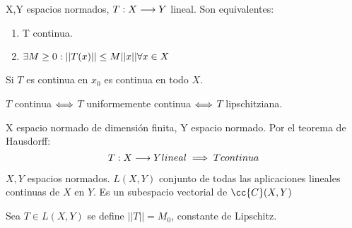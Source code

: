 \begin{prop}
    X,Y espacios normados, $T:X\longrightarrow Y$ lineal. Son equivalentes:
    \begin{enumerate}
        \item T continua.
        \item $\exists M\geq 0 : ||T(x)|| \leq M ||x|| \\\forall x\in X$
    \end{enumerate}
\end{prop}

\begin{observacion}
    Si $T$ es continua en $x_0$ es continua en todo $X$.
\end{observacion}

\begin{observacion}
    $T$ continua $\Longleftrightarrow$ $T$ uniformemente continua $\Longleftrightarrow$ $T$ lipschitziana.
\end{observacion}

\begin{prop}
    X espacio normado de dimensión finita, Y espacio normado. Por el teorema de Hausdorff:
    $$T:X\longrightarrow Y \\ lineal \implies T \\ continua$$
\end{prop}

\begin{definicion}
    $X,Y$ espacios normados. $L(X,Y)$ conjunto de todas las aplicaciones lineales continuas de $X$ en $Y$. Es un subespacio vectorial de $\cc{C}(X,Y)$
\end{definicion}

\begin{definicion}
    Sea $T\in L(X,Y)$ se define $||T|| = M_0$, constante de Lipschitz.
\end{definicion}